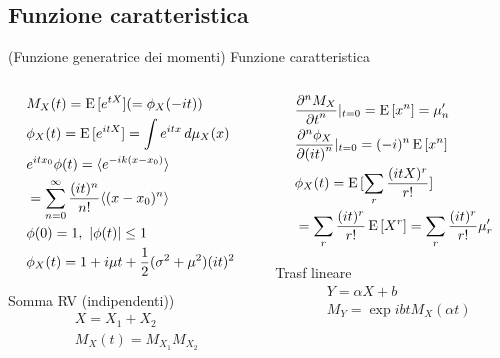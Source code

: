 \documentclass[asd-beamer.tex]{subfiles}
\begin{document}
\subsection{Funzione caratteristica}

\begin{frame}{(Funzione generatrice dei momenti) Funzione caratteristica}
\begin{columns}[T]
	\begin{column}{0.5\textwidth}
		\begin{align*}
		&M_X(t)=\E{[\exp{tX}]}(=\phi_X(-it))\\
		&\phi_X(t)=\E{[\exp{itX}]}=\int\exp{itx}\,d\mu_X(x)\\
		&\exp{itx_0}\phi(t)=\exv{\exp{-ik(x-x_0)}}\\
		&=\sum_{n=0}^{\infty}\frac{(it)^n}{n!}\exv{(x-x_0)^n}\\
		&\phi(0)=1,\ |\phi(t)|\leq1\\
		&\phi_X(t)=1+i\mu t+\frac{1}{2}(\sigma^2+\mu^2)(it)^2
		\end{align*}
		\begin{block}{Somma RV (indipendenti))}
			\begin{align*}
			&X=X_1+X_2\\
			&M_X(t)=M_{X_1}M_{X_2}
			\end{align*}
		\end{block}
	\end{column}
	\begin{column}{0.5\textwidth}
		\begin{align*}
		&\PDyn{t}{M_X}{n}|_{t=0}=\E{[x^n]}=\mu_n'\\
		&\PDyn{(it)}{\phi_X}{n}|_{t=0}=(-i)^n\E{[x^n]}\\
		&\phi_X(t)=\E{[\sum_r\frac{(itX)^r}{r!}]}\\
		&=\sum_r\frac{(it)^r}{r!}\E{[X^r]}=\sum_r\frac{(it)^r}{r!}\mu_r'
		\end{align*}
		\begin{block}{}\end{block}
		\begin{block}{Trasf lineare}
			\begin{align*}
			&Y=\alpha X+b\\
			&M_Y=\exp{ibt}M_X(\alpha t)
			\end{align*}
		\end{block}
	\end{column}
\end{columns}
\end{frame}
\end{document}
